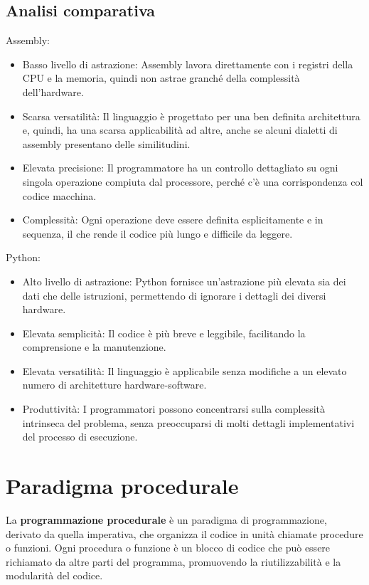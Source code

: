\documentclass[
  letterpaper,
]{scrbook}
\begin{document}
\subsection{Analisi comparativa}\label{analisi-comparativa}

Assembly:

\begin{itemize}
\item
  Basso livello di astrazione: Assembly lavora direttamente con i
  registri della CPU e la memoria, quindi non astrae granché della
  complessità dell'hardware.
\item
  Scarsa versatilità: Il linguaggio è progettato per una ben definita
  architettura e, quindi, ha una scarsa applicabilità ad altre, anche se
  alcuni dialetti di assembly presentano delle similitudini.
\item
  Elevata precisione: Il programmatore ha un controllo dettagliato su
  ogni singola operazione compiuta dal processore, perché c'è una
  corrispondenza col codice macchina.
\item
  Complessità: Ogni operazione deve essere definita esplicitamente e in
  sequenza, il che rende il codice più lungo e difficile da leggere.
\end{itemize}

Python:

\begin{itemize}
\item
  Alto livello di astrazione: Python fornisce un'astrazione più elevata
  sia dei dati che delle istruzioni, permettendo di ignorare i dettagli
  dei diversi hardware.
\item
  Elevata semplicità: Il codice è più breve e leggibile, facilitando la
  comprensione e la manutenzione.
\item
  Elevata versatilità: Il linguaggio è applicabile senza modifiche a un
  elevato numero di architetture hardware-software.
\item
  Produttività: I programmatori possono concentrarsi sulla complessità
  intrinseca del problema, senza preoccuparsi di molti dettagli
  implementativi del processo di esecuzione.
\end{itemize}

\section{Paradigma procedurale}\label{paradigma-procedurale}

La \textbf{programmazione procedurale} è un paradigma di programmazione,
derivato da quella imperativa, che organizza il codice in unità chiamate
procedure o funzioni. Ogni procedura o funzione è un blocco di codice
che può essere richiamato da altre parti del programma, promuovendo la
riutilizzabilità e la modularità del codice.
\end{document}
